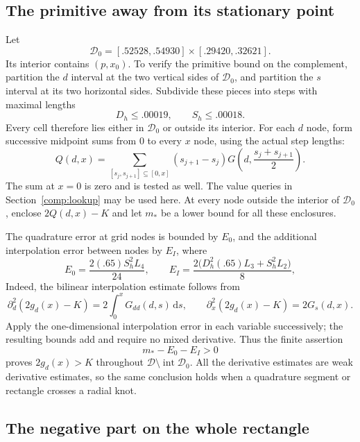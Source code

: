 \subsection{The primitive away from its stationary point}
\label{comp:outer-grid}

Let
\begin{equation}\label{comp:inner-domain}
 \mathcal D_0=[.52528,.54930]\times[.29420,.32621].
\end{equation}
Its interior contains $(p,x_0)$.  To verify the primitive bound on
the complement, partition the $d$ interval at the two vertical
sides of $\mathcal D_0$, and partition the $s$ interval at its two
horizontal sides.  Subdivide these pieces into steps with maximal
lengths
\[
 D_h\le.00019,\qquad S_h\le.00018.
\]
Every cell therefore lies either in $\mathcal D_0$ or outside its
interior.  For each $d$ node, form successive midpoint sums from
$0$ to every $x$ node, using the actual step lengths:
\[
 Q(d,x)=\sum_{[s_j,s_{j+1}]\subseteq[0,x]}
          (s_{j+1}-s_j)
                     G\left(d,\frac{s_j+s_{j+1}}2\right).
\]
The sum at $x=0$ is zero and is tested as well.  The value queries
in Section~\ref{comp:lookup} may be used here.  At every node
outside the interior of $\mathcal D_0$, enclose $2Q(d,x)-K$ and
let $m_*$ be a lower bound for all these enclosures.

The quadrature error at grid nodes is bounded by $E_0$, and the
additional interpolation error between nodes by $E_I$, where
\begin{equation}\label{comp:outer-errors}
 E_0=\frac{2(.65)S_h^2L_4}{24},\qquad
 E_I=\frac{2\bigl(D_h^2(.65)L_3+S_h^2L_2\bigr)}8,
\end{equation}
Indeed, the bilinear interpolation estimate follows from
\[
 \partial_d^2(2g_d(x)-K)=2\int_0^xG_{dd}(d,s)\,\mathrm ds,
 \qquad \partial_x^2(2g_d(x)-K)=2G_s(d,x).
\]
Apply the one-dimensional interpolation error in each variable
successively; the resulting bounds add and require no mixed
derivative.  Thus the finite assertion
\begin{equation}\label{comp:outer-assertion}
                         m_*-E_0-E_I>0
\end{equation}
proves $2g_d(x)>K$ throughout
$\mathcal D\setminus\operatorname{int}\mathcal D_0$.
All the derivative estimates are weak derivative estimates, so
the same conclusion holds when a quadrature segment or rectangle
crosses a radial knot.

\subsection{The negative part on the whole rectangle}
\label{comp:negative-part}

